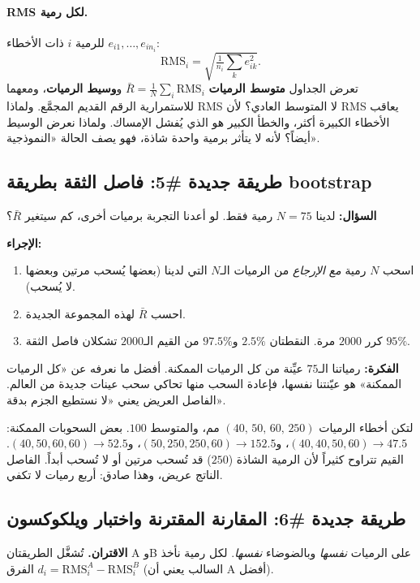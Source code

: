 \documentclass[11pt,a4paper]{article}
\newcommand{\en}[1]{\textenglish{#1}}
\begin{document}
\paragraph{\en{RMS} لكل رمية.} للرمية $i$ ذات الأخطاء $e_{i1},\dots,e_{in_i}$:
\[ \mathrm{RMS}_i=\sqrt{\tfrac{1}{n_i}\textstyle\sum_k e_{ik}^2}. \]
تعرض الجداول \textbf{متوسط الرميات} $\bar R=\frac1N\sum_i\mathrm{RMS}_i$ و\textbf{وسيط الرميات}، ومعهما للاستمرارية الرقم
القديم المجمَّع. ولماذا \en{RMS} لا المتوسط العادي؟ لأن \en{RMS} يعاقب الأخطاء الكبيرة أكثر، والخطأ الكبير هو الذي يُفشل الإمساك.
ولماذا نعرض الوسيط أيضاً؟ لأنه لا يتأثر برمية واحدة شاذة، فهو يصف الحالة «النموذجية».

\subsection{طريقة جديدة \#5: فاصل الثقة بطريقة \en{bootstrap}}
\textbf{السؤال:} لدينا $N=75$ رمية فقط. لو أعدنا التجربة برميات أخرى، كم سيتغير $\bar R$؟

\textbf{الإجراء:}
\begin{enumerate}
\item اسحب $N$ رمية \emph{مع الإرجاع} من الرميات الـ$N$ التي لدينا (بعضها يُسحب مرتين وبعضها لا يُسحب).
\item احسب $\bar R$ لهذه المجموعة الجديدة.
\item كرر $2000$ مرة. النقطتان $2.5\%$ و$97.5\%$ من القيم الـ$2000$ تشكلان فاصل الثقة $95\%$.
\end{enumerate}

\textbf{الفكرة:} رمياتنا الـ$75$ عيِّنة من كل الرميات الممكنة. أفضل ما نعرفه عن «كل الرميات الممكنة» هو عيّنتنا نفسها، فإعادة
السحب منها تحاكي سحب عينات جديدة من العالم. الفاصل العريض يعني «لا نستطيع الجزم بدقة».

\begin{example}
لتكن أخطاء الرميات $(40,\,50,\,60,\,250)$ مم، والمتوسط $100$. بعض السحوبات الممكنة:
$(40,40,50,60)\to47.5$، و$(50,250,250,60)\to152.5$، و$(40,50,60,60)\to52.5$. القيم تتراوح كثيراً لأن الرمية الشاذة ($250$) قد
تُسحب مرتين أو لا تُسحب أبداً. الفاصل الناتج عريض، وهذا صادق: أربع رميات لا تكفي.
\end{example}

\subsection{طريقة جديدة \#6: المقارنة المقترنة واختبار ويلكوكسون}
\textbf{الاقتران.} تُشغَّل الطريقتان \en{A} و\en{B} على الرميات \emph{نفسها} وبالضوضاء \emph{نفسها}. لكل رمية نأخذ الفرق
$d_i=\mathrm{RMS}_i^A-\mathrm{RMS}_i^B$ (السالب يعني أن \en{A} أفضل).
\end{document}
